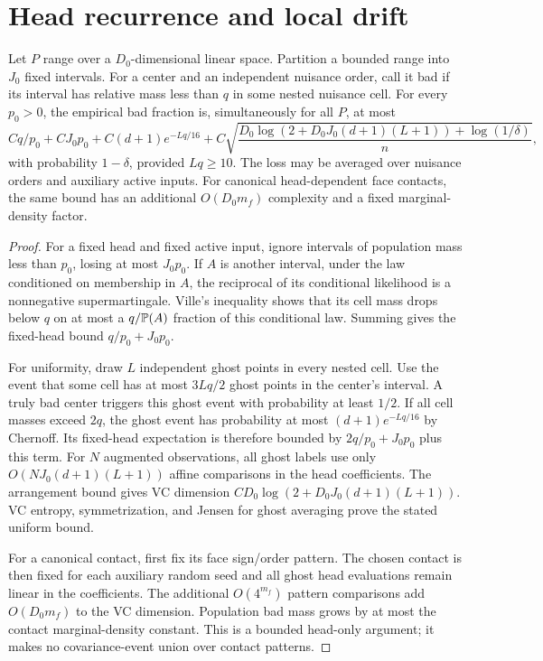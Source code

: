 \section{Head recurrence and local drift}\label{sec:head-recurrence}

\begin{lemma}\label{lem:head-recurrence}
Let $P$ range over a $D_0$-dimensional linear space. Partition a bounded
range into $J_0$ fixed intervals. For a center and an independent nuisance
order, call it bad if its interval has relative mass less than $q$ in
some nested nuisance cell. For every $p_0>0$, the empirical bad fraction
is, simultaneously for all $P$, at most
\[
 Cq/p_0+CJ_0p_0+C(d+1)e^{-Lq/16}
 +C\sqrt{\frac{D_0\log(2+D_0J_0(d+1)(L+1))
                         +\log(1/\delta)}n},
\]
with probability $1-\delta$, provided $Lq\ge10$.
The loss may be averaged over nuisance orders and auxiliary active
inputs. For canonical head-dependent face contacts, the same bound has
an additional $O(D_0m_f)$ complexity and a fixed marginal-density factor.
\end{lemma}
\begin{proof}
For a fixed head and fixed active input, ignore intervals of population
mass less than $p_0$, losing at most $J_0p_0$. If $A$ is another interval,
under the law conditioned on membership in $A$, the reciprocal of its
conditional likelihood is a nonnegative supermartingale. Ville's
inequality shows that its cell mass drops below $q$ on at most a
$q/\mathbb P(A)$ fraction of this conditional law. Summing gives the fixed-head
bound $q/p_0+J_0p_0$.

For uniformity, draw $L$ independent ghost points in every nested cell.
Use the event that some cell has at most $3Lq/2$ ghost points in the
center's interval. A truly bad center triggers this ghost event with
probability at least $1/2$. If all cell masses exceed $2q$, the ghost
event has probability at most $(d+1)e^{-Lq/16}$ by Chernoff. Its fixed-head
expectation is therefore bounded by $2q/p_0+J_0p_0$ plus this term.
For $N$ augmented observations, all ghost labels use only
$O(NJ_0(d+1)(L+1))$ affine comparisons in the head coefficients.
The arrangement bound gives VC dimension
$CD_0\log(2+D_0J_0(d+1)(L+1))$. VC entropy, symmetrization, and Jensen
for ghost averaging prove the stated uniform bound.

For a canonical contact, first fix its face sign/order pattern.
The chosen contact is then fixed for each auxiliary random seed and
all ghost head evaluations remain linear in the coefficients.
The additional $O(4^{m_f})$ pattern comparisons add $O(D_0m_f)$ to
the VC dimension. Population bad mass grows by at most the contact
marginal-density constant. This is a bounded head-only argument; it
makes no covariance-event union over contact patterns.
\end{proof}

